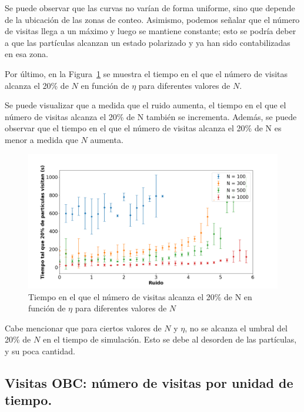 \documentclass[11pt, a4paper]{article}
\begin{document}
            Se puede observar que las curvas no varían de forma uniforme, sino que depende de la ubicación de las zonas de conteo.
            Asimismo, podemos señalar que el número de visitas llega a un máximo y luego se mantiene constante; esto se
            podría deber a que las partículas alcanzan un estado polarizado y ya han sido contabilizadas en esa zona.

            Por último, en la Figura~\ref{fig:visitas_pbc_3} se muestra el tiempo en el que el número de visitas alcanza
            el 20\% de $N$ en función de $\eta$ para diferentes valores de $N$.

            Se puede visualizar que a medida que el ruido aumenta, el tiempo en el que el número de visitas alcanza
            el 20\% de N también se incrementa.
            Además, se puede observar que el tiempo en el que el número de visitas alcanza el 20\% de N es menor a medida que $N$ aumenta.

            \begin{figure}[H]
                \centering
                \includegraphics[width=\textwidth]{./threshold_vs_eta-pbc}
                \caption{Tiempo en el que el número de visitas alcanza el 20\% de N en función de $\eta$ para diferentes valores de $N$}
                \label{fig:visitas_pbc_3}
            \end{figure}

            Cabe mencionar que para ciertos valores de $N$ y $\eta$, no se alcanza el umbral del 20\% de $N$ en el tiempo de simulación.
            Esto se debe al desorden de las partículas, y su poca cantidad.

        \subsection{Visitas OBC: número de visitas por unidad de tiempo.}
        \label{subsec:resultados-visitas-obc}
\end{document}
